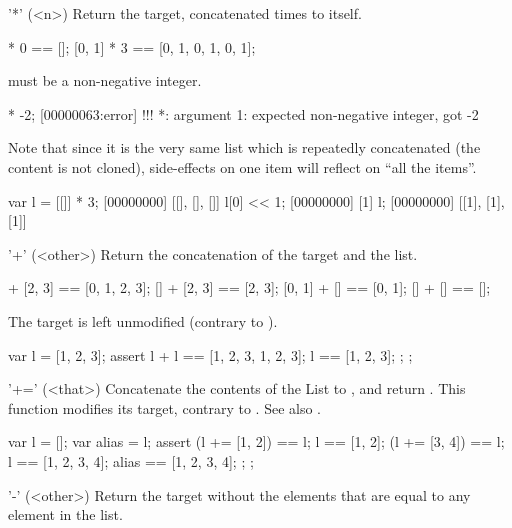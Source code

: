 \begin{urbiscriptapi}
\item['*'](<n>)%
  Return the target, concatenated  times to itself.
\begin{urbiassert}
[0, 1] * 0 == [];
[0, 1] * 3 == [0, 1, 0, 1, 0, 1];
\end{urbiassert}

   must be a non-negative integer.

\begin{urbiscript}
[0, 1] * -2;
[00000063:error] !!! *: argument 1: expected non-negative integer, got -2
\end{urbiscript}


  Note that since it is the very same list which is repeatedly
  concatenated (the content is not cloned), side-effects on one item
  will reflect on ``all the items''.

\begin{urbiscript}
var l = [[]] * 3;
[00000000] [[], [], []]
l[0] << 1;
[00000000] [1]
l;
[00000000] [[1], [1], [1]]
\end{urbiscript}

\item['+'](<other>)%
  Return the concatenation of the target and the  list.

\begin{urbiassert}
[0, 1] + [2, 3] == [0, 1, 2, 3];
    [] + [2, 3] == [2, 3];
[0, 1] + []     == [0, 1];
    [] + []     == [];
\end{urbiassert}

The target is left unmodified (contrary to ).
\begin{urbiscript}
{
  var l = [1, 2, 3];
  assert
  {
    l + l == [1, 2, 3, 1, 2, 3];
    l     == [1, 2, 3];
  };
};
\end{urbiscript}

\item['+='](<that>)%
  Concatenate the contents of the List  to \this, and return
  \this.  This function modifies its target, contrary to .  See
  also .

\begin{urbiscript}
{
  var l = [];
  var alias = l;
  assert
  {
    (l += [1, 2]) == l;
    l == [1, 2];
    (l += [3, 4]) == l;
    l == [1, 2, 3, 4];
    alias == [1, 2, 3, 4];
  };
};
\end{urbiscript}

\item['-'](<other>)%
  Return the target without the elements that are equal to any element
  in the  list.


\end{urbiscriptapi}
